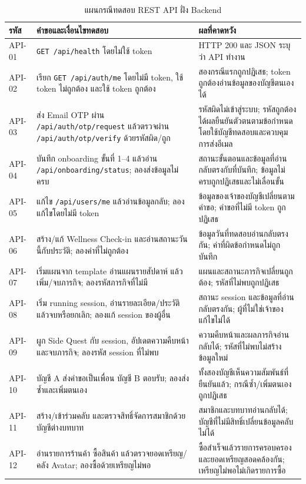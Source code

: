 \begin{table}[H]
\centering
\small
\caption{แผนกรณีทดสอบ REST API ฝั่ง Backend}
\label{tab:backend-api-test-cases}
\renewcommand{\arraystretch}{1.2}
\begin{tabular}{|>{\raggedright\arraybackslash}p{}|>{\raggedright\arraybackslash}p{}|>{\raggedright\arraybackslash}p{}|}
\hline
\textbf{รหัส} & \textbf{คำขอและเงื่อนไขทดสอบ} & \textbf{ผลที่คาดหวัง} \\ \hline
API-01 & \texttt{GET /api/health} โดยไม่ใช้ token & HTTP 200 และ JSON ระบุว่า API ทำงาน \\ \hline
API-02 & เรียก \texttt{GET /api/auth/me} โดยไม่มี token, ใช้ token ไม่ถูกต้อง และใช้ token ถูกต้อง & สองกรณีแรกถูกปฏิเสธ; token ถูกต้องอ่านข้อมูลของบัญชีตนเองได้ \\ \hline
API-03 & ส่ง Email OTP ผ่าน \texttt{/api/auth/otp/request} แล้วตรวจผ่าน \texttt{/api/auth/otp/verify} ด้วยรหัสผิด/ถูก & รหัสผิดไม่เข้าสู่ระบบ; รหัสถูกต้องได้ผลยืนยันตัวตนตามข้อกำหนด โดยใช้บัญชีทดสอบและควบคุมการส่งอีเมล \\ \hline
API-04 & บันทึก onboarding ขั้นที่ 1--4 แล้วอ่าน \texttt{/api/onboarding/status}; ลองส่งข้อมูลไม่ครบ & สถานะขั้นตอนและข้อมูลที่อ่านกลับตรงกับที่บันทึก; ข้อมูลไม่ครบถูกปฏิเสธและไม่เลื่อนขั้น \\ \hline
API-05 & แก้ไข \texttt{/api/users/me} แล้วอ่านข้อมูลกลับ; ลองแก้ไขโดยไม่มี token & ข้อมูลของเจ้าของบัญชีเปลี่ยนตามคำขอ; คำขอที่ไม่มี token ถูกปฏิเสธ \\ \hline
API-06 & สร้าง/แก้ Wellness Check-in และอ่านสถานะวันนี้กับประวัติ; ลองค่าที่ไม่ถูกต้อง & ข้อมูลวันที่ทดสอบอ่านกลับตรงกัน; ค่าที่ผิดข้อกำหนดไม่ถูกบันทึก \\ \hline
API-07 & เริ่มแผนจาก template อ่านแผนรายสัปดาห์ แล้วเพิ่ม/จบภารกิจ; ลองรหัสภารกิจที่ไม่มี & แผนและสถานะภารกิจเปลี่ยนถูกต้อง; รหัสที่ไม่พบถูกปฏิเสธ \\ \hline
API-08 & เริ่ม running session, อ่านรายละเอียด/ประวัติ แล้วจบหรือยกเลิก; ลองแก้ session ของผู้อื่น & สถานะ session และข้อมูลที่อ่านกลับตรงกัน; ผู้ที่ไม่ใช่เจ้าของแก้ไขไม่ได้ \\ \hline
API-09 & ผูก Side Quest กับ session, อัปเดตความคืบหน้า และจบภารกิจ; ลองรหัส session ที่ไม่พบ & ความคืบหน้าและผลภารกิจอ่านกลับได้; รหัสที่ไม่พบไม่สร้างข้อมูลใหม่ \\ \hline
API-10 & บัญชี A ส่งคำขอเป็นเพื่อน บัญชี B ตอบรับ; ลองส่งซ้ำและเพิ่มตนเอง & ทั้งสองบัญชีเห็นความสัมพันธ์ที่ยืนยันแล้ว; กรณีซ้ำ/เพิ่มตนเองถูกปฏิเสธ \\ \hline
API-11 & สร้าง/เข้าร่วมคลับ และตรวจสิทธิ์จัดการสมาชิกด้วยบัญชีต่างบทบาท & สมาชิกและบทบาทอ่านกลับได้; บัญชีที่ไม่มีสิทธิ์เปลี่ยนข้อมูลคลับไม่ได้ \\ \hline
API-12 & อ่านรายการร้านค้า ซื้อสินค้า แล้วตรวจยอดเหรียญ/คลัง Avatar; ลองซื้อด้วยเหรียญไม่พอ & ซื้อสำเร็จแล้วรายการครอบครองและยอดเหรียญสอดคล้องกัน; เหรียญไม่พอไม่เกิดรายการซื้อ \\ \hline
\end{tabular}
\end{table}

